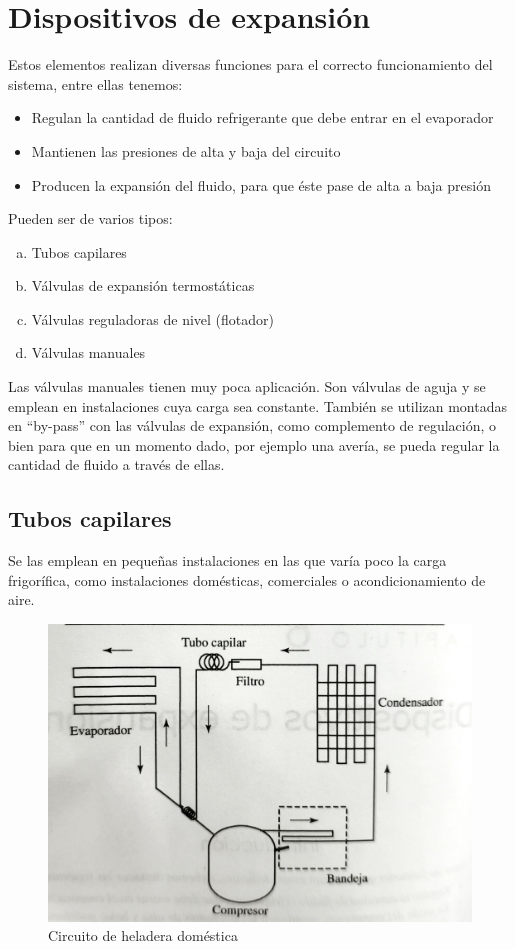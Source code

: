 \section{Dispositivos de expansi\'on}

Estos elementos realizan diversas funciones para el correcto funcionamiento del sistema, entre ellas tenemos:
\begin{itemize}
    \item Regulan la cantidad de fluido refrigerante que debe entrar en el evaporador
    \item Mantienen las presiones de alta y baja del circuito
    \item Producen la expansi\'on del fluido, para que \'este pase de alta a baja presi\'on
\end{itemize}

Pueden ser de varios tipos:
\begin{enumerate}[a.]
    \item Tubos capilares
    \item V\'alvulas de expansi\'on termost\'aticas
    \item V\'alvulas reguladoras de nivel (flotador)
    \item V\'alvulas manuales
\end{enumerate}

Las v\'alvulas manuales tienen muy poca aplicaci\'on. Son v\'alvulas de aguja y se emplean en instalaciones cuya carga sea constante. Tambi\'en se utilizan montadas en ``by-pass'' con las v\'alvulas de expansi\'on, como complemento de regulaci\'on, o bien para que en un momento dado, por ejemplo una aver\'ia, se pueda regular la cantidad de fluido a trav\'es de ellas.

\subsection{Tubos capilares}

Se las emplean en pequeñas instalaciones en las que var\'ia poco la carga frigor\'ifica, como instalaciones dom\'esticas, comerciales o acondicionamiento de aire.

\begin{figure}[H]
    \centering
    \includegraphics[width=0.6\linewidth]{figuras/dispositivos-de-expansion/circuito de heladera doméstica.jpg}
    \caption{Circuito de heladera dom\'estica}
    \label{fig:circuito-heladera-domestica}
\end{figure}

